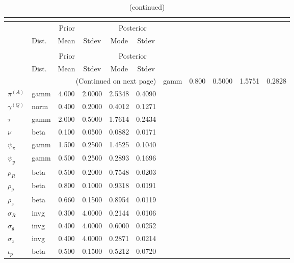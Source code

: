  
\begin{center}
\begin{longtable}{llcccc} 
\caption{Results from posterior maximization (parameters)}\\
 \label{Table:Posterior:1}\\
\toprule 
  & \multicolumn{3}{c}{Prior}  &  \multicolumn{2}{c}{Posterior} \\
  \cmidrule(r{.75em}){2-4} \cmidrule(r{.75em}){5-6}
  & Dist. & Mean  & Stdev & Mode & Stdev \\ 
\midrule \endfirsthead 
\caption{(continued)}\\
 \bottomrule 
  & \multicolumn{3}{c}{Prior}  &  \multicolumn{2}{c}{Posterior} \\
  \cmidrule(r{.75em}){2-4} \cmidrule(r{.75em}){5-6}
  & Dist. & Mean  & Stdev & Mode & Stdev \\ 
\midrule \endhead 
\bottomrule \multicolumn{6}{r}{(Continued on next page)}\endfoot 
\bottomrule\endlastfoot 
${r_{A}}$ & gamm &   0.800 & 0.5000 &   1.5751 &  0.2828 \\ 
${\pi^{(A)}}$ & gamm &   4.000 & 2.0000 &   2.5348 &  0.4090 \\ 
${\gamma^{(Q)}}$ & norm &   0.400 & 0.2000 &   0.4012 &  0.1271 \\ 
${\tau}$ & gamm &   2.000 & 0.5000 &   1.7614 &  0.2434 \\ 
${\nu}$ & beta &   0.100 & 0.0500 &   0.0882 &  0.0171 \\ 
${\psi_\pi}$ & gamm &   1.500 & 0.2500 &   1.4525 &  0.1040 \\ 
${\psi_y}$ & gamm &   0.500 & 0.2500 &   0.2893 &  0.1696 \\ 
${\rho_R}$ & beta &   0.500 & 0.2000 &   0.7548 &  0.0203 \\ 
${\rho_{g}}$ & beta &   0.800 & 0.1000 &   0.9318 &  0.0191 \\ 
${\rho_z}$ & beta &   0.660 & 0.1500 &   0.8954 &  0.0119 \\ 
${\sigma_R}$ & invg &   0.300 & 4.0000 &   0.2144 &  0.0106 \\ 
${\sigma_{g}}$ & invg &   0.400 & 4.0000 &   0.6000 &  0.0252 \\ 
${\sigma_z}$ & invg &   0.400 & 4.0000 &   0.2871 &  0.0214 \\ 
${\iota_p}$ & beta &   0.500 & 0.1500 &   0.5212 &  0.0720 \\ 
\end{longtable}
 \end{center}
